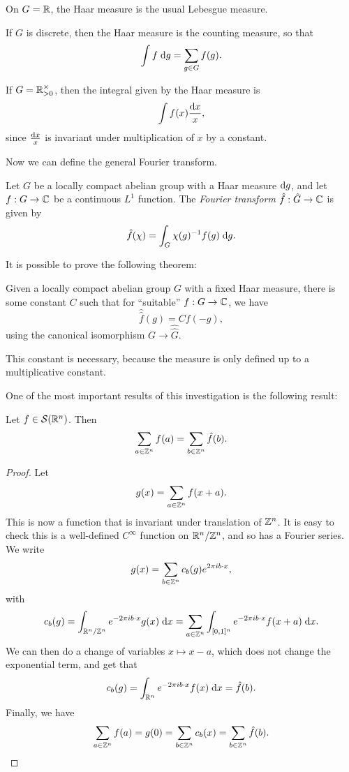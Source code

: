 \documentclass[a4paper]{article}
\begin{document}
\begin{eg}
  On $G = \mathbb{R}$, the Haar measure is the usual Lebesgue measure.
\end{eg}

\begin{eg}
  If $G$ is discrete, then the Haar measure is the counting measure, so that
  \[
    \int f\;\mathrm{d} g = \sum_{g \in G} f(g).
  \]
\end{eg}

\begin{eg}
  If $G = \mathbb{R}_{> 0}^\times$, then the integral given by the Haar measure is
  \[
    \int f(x) \frac{\mathrm{d} x}{x},
  \]
  since $\frac{\mathrm{d} x}{x}$ is invariant under multiplication of $x$ by a constant.
\end{eg}

Now we can define the general Fourier transform.
\begin{defi}
  Let $G$ be a locally compact abelian group with a Haar measure $\mathrm{d} g$, and let $f: G \to \mathbb{C}$ be a continuous $L^1$ function. The \emph{Fourier transform} $\hat{f}: \hat{G} \to \mathbb{C}$ is given by
  \[
    \hat{f}(\chi) = \int_G \chi(g)^{-1}f(g) \;\mathrm{d} g.
  \]
\end{defi}

It is possible to prove the following theorem:
\begin{thm}
 Given a locally compact abelian group $G$ with a fixed Haar measure, there is some constant $C$ such that for ``suitable'' $f: G \to \mathbb{C}$, we have
 \[
   \hat{\hat{f}}(g) = C f(-g),
 \]
 using the canonical isomorphism $G \to \hat{\hat{G}}$.
\end{thm}
This constant is necessary, because the measure is only defined up to a multiplicative constant.

One of the most important results of this investigation is the following result:
\begin{thm}
  Let $f \in \mathcal{S}(\mathbb{R}^n)$. Then
  \[
    \sum_{a \in \mathbb{Z}^n} f(a) = \sum_{b \in \mathbb{Z}^n} \hat{f}(b).
  \]
\end{thm}

\begin{proof}
  Let
  \[
    g(x) = \sum_{a \in \mathbb{Z}^n} f(x + a).
  \]
  This is now a function that is invariant under translation of $\mathbb{Z}^n$. It is easy to check this is a well-defined $C^\infty$ function on $\mathbb{R}^n/\mathbb{Z}^n$, and so has a Fourier series. We write
  \[
    g(x) = \sum_{b \in \mathbb{Z}^n} c_b(g) e^{2\pi i b \cdot x},
  \]
  with
  \[
    c_b(g) = \int_{\mathbb{R}^n/\mathbb{Z}^n} e^{-2\pi i b\cdot x} g(x) \;\mathrm{d} x = \sum_{a \in \mathbb{Z}^n} \int_{[0, 1]^n} e^{-2\pi i b\cdot x} f(x + a) \;\mathrm{d} x.
  \]
  We can then do a change of variables $x \mapsto x - a$, which does not change the exponential term, and get that
  \[
    c_b(g) = \int_{\mathbb{R}^n} e^{-2\pi i b \cdot x} f(x) \;\mathrm{d} x = \hat{f}(b).
  \]
  Finally, we have
  \[
    \sum_{a \in \mathbb{Z}^n} f(a) = g(0) = \sum_{b \in \mathbb{Z}^n} c_b(x) = \sum_{b \in \mathbb{Z}^n} \hat{f}(b).\qedhere
  \]
\end{proof}
\end{document}
